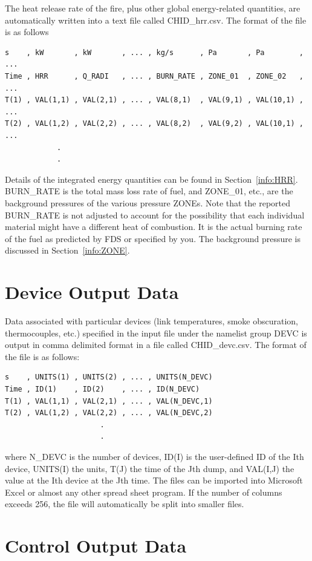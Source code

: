 \documentclass[11pt]{book}
\begin{document}
\label{out:hrr}
The heat release rate of the fire, plus other global energy-related quantities, are automatically written into a text file
called {\ct CHID\_hrr.csv}. The format of the file is as follows
\begin{lstlisting}
s    , kW       , kW       , ... , kg/s      , Pa       , Pa        , ...
Time , HRR      , Q_RADI   , ... , BURN_RATE , ZONE_01  , ZONE_02   , ...
T(1) , VAL(1,1) , VAL(2,1) , ... , VAL(8,1)  , VAL(9,1) , VAL(10,1) , ...
T(2) , VAL(1,2) , VAL(2,2) , ... , VAL(8,2)  , VAL(9,2) , VAL(10,1) , ...
            .
            .
 \end{lstlisting}
Details of the integrated energy quantities can be found in Section~\ref{info:HRR}. {\ct BURN\_RATE} is the total mass loss rate of fuel, and {\ct ZONE\_01}, etc., are the background pressures of the various pressure {\ct ZONE}s. Note that the reported {\ct BURN\_RATE} is not adjusted to account for the possibility that each individual material might have a different heat of combustion. It is the actual burning rate of the fuel as predicted by FDS or specified by you. The background pressure is discussed in Section~\ref{info:ZONE}.


\section{Device Output Data}
\label{out:DEVC}

Data associated with particular devices (link temperatures, smoke obscuration, thermocouples, etc.) specified in the input file under the namelist group {\ct DEVC} is output in comma delimited format in a file called {\ct CHID\_devc.csv}. The format of the file is as follows:
\begin{lstlisting}
s    , UNITS(1) , UNITS(2) , ... , UNITS(N_DEVC)
Time , ID(1)    , ID(2)    , ... , ID(N_DEVC)
T(1) , VAL(1,1) , VAL(2,1) , ... , VAL(N_DEVC,1)
T(2) , VAL(1,2) , VAL(2,2) , ... , VAL(N_DEVC,2)
                      .
                      .
\end{lstlisting}
where {\ct N\_DEVC} is the number of devices, {\ct ID(I)} is the user-defined ID of the {\ct I}th device, {\ct UNITS(I)} the units, {\ct T(J)} the time of the {\ct J}th dump, and
{\ct VAL(I,J)} the value at the {\ct I}th device at the {\ct J}th time. The files can be imported into Microsoft Excel or almost any other spread sheet program. If the number of columns exceeds 256, the file will automatically be split into smaller files.

\section{Control Output Data}
\label{out:CTRL}
\end{document}
